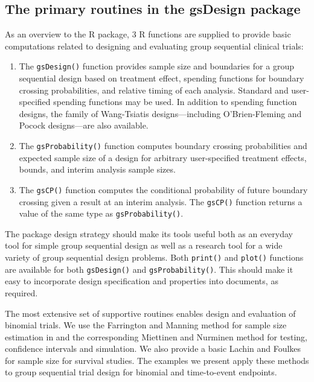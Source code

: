 \subsection{The primary routines in the gsDesign package}
 
As an overview to the R package, 3 R functions are supplied to provide basic computations related to designing and evaluating group sequential clinical trials:

\begin{enumerate}
\item The \texttt{gsDesign()} function provides sample size and
boundaries for a group sequential design based on treatment effect, spending
functions for boundary crossing probabilities, and relative timing of each
analysis. Standard and user-specified spending functions may be used. In
addition to spending function designs, the family of Wang-Tsiatis
designs---including O'Brien-Fleming and Pocock designs---are also available.

\item The \texttt{gsProbability()} function computes boundary crossing 
probabilities and expected sample size of a design for arbitrary 
user-specified treatment effects, bounds, and interim analysis sample sizes.

\item The \texttt{gsCP()} function computes the conditional probability of 
future boundary crossing given a result at an interim analysis. 
The \texttt{gsCP()} function returns a value of the same type as 
\texttt{gsProbability()}.
\end{enumerate}

The package design strategy should make its tools useful both as an
everyday tool for simple group sequential design as well as a research tool
for a wide variety of group sequential design problems. Both \texttt{print()}
and \texttt{plot()} functions are available for both \texttt{gsDesign()} and
\texttt{gsProbability()}. This should make it easy to incorporate design
specification and properties into documents, as required.

The most extensive set of supportive routines enables design and evaluation of binomial trials.
We use the Farrington and Manning \cite{FarringtonManning} method for sample size estimation in  and the corresponding Miettinen and Nurminen \cite{MandN} method for testing, confidence intervals and simulation. We also provide a basic Lachin and Foulkes \cite{LachinFoulkes} for sample size for survival studies. 
The examples we present apply these methods to group sequential trial design for binomial and time-to-event endpoints.

